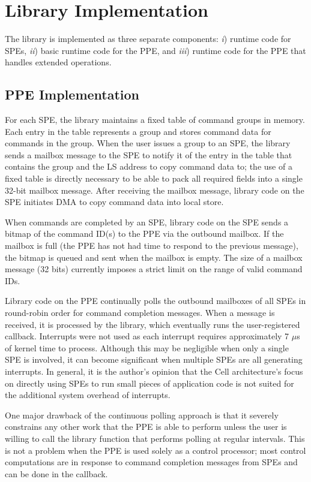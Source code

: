 \section{Library Implementation}

The library is implemented as three separate components: \emph{i}) runtime code for SPEs, \emph{ii}) basic runtime code for the PPE, and \emph{iii}) runtime code for the PPE that handles extended operations.

\subsection{PPE Implementation}

For each SPE, the library maintains a fixed table of command groups in memory. Each entry in the table represents a group and stores command data for commands in the group. When the user issues a group to an SPE, the library sends a mailbox message to the SPE to notify it of the entry in the table that contains the group and the LS address to copy command data to; the use of a fixed table is directly necessary to be able to pack all required fields into a single 32-bit mailbox message. After receiving the mailbox message, library code on the SPE initiates DMA to copy command data into local store.

When commands are completed by an SPE, library code on the SPE sends a bitmap of the command ID(s) to the PPE via the outbound mailbox. If the mailbox is full (the PPE has not had time to respond to the previous message), the bitmap is queued and sent when the mailbox is empty. The size of a mailbox message (32 bits) currently imposes a strict limit on the range of valid command IDs.

Library code on the PPE continually polls the outbound mailboxes of all SPEs in round-robin order for command completion messages. When a message is received, it is processed by the library, which eventually runs the user-registered callback. Interrupts were not used as each interrupt requires approximately 7 $\mu$s of kernel time to process. Although this may be negligible when only a single SPE is involved, it can become significant when multiple SPEs are all generating interrupts. In general, it is the author's opinion that the Cell architecture's focus on directly using SPEs to run small pieces of application code is not suited for the additional system overhead of interrupts.

One major drawback of the continuous polling approach is that it severely constrains any other work that the PPE is able to perform unless the user is willing to call the library function that performs polling at regular intervals. This is not a problem when the PPE is used solely as a control processor; most control computations are in response to command completion messages from SPEs and can be done in the callback.

